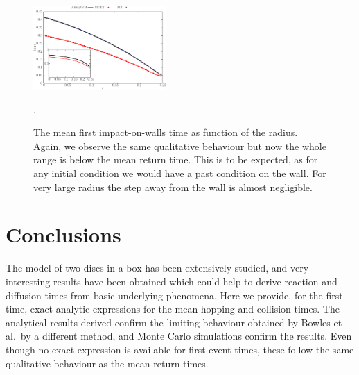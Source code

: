 \documentclass[superscriptaddress,pre,reprint,showpacs,onecolumn]{revtex4-1}
\newcommand{\etal}{et al.\ }
\begin{document}
\begin{figure}[h]
  \centering
  \includegraphics[width=0.45\textwidth]{./FigurasPerfectas/FistImpactTime01-ForPaper.pdf}
  \caption{The mean first impact-on-walls time as function of the radius. Again, 
    we observe the same qualitative behaviour but now the whole range is below
    the mean return time. This is to be expected, as for any initial condition
    we would have a past condition on the wall. For very
    large radius the step away from the wall is almost negligible.}\label{FirstImp01}.
\end{figure}


\section{Conclusions}


The model of two discs in a box has been extensively studied, and
very interesting results have been obtained which could help
to derive reaction
and diffusion times from basic underlying phenomena.  Here
we provide, for the first time, exact analytic expressions for the mean hopping and
collision times. 
The analytical results derived 
confirm the limiting behaviour obtained
by Bowles \etal by a different method, and Monte Carlo simulations confirm 
the results. 
Even though no exact expression is available for first event times, these follow
the same qualitative behaviour as the mean return times.

\end{document}
